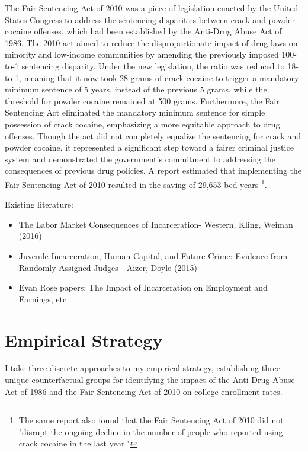 \documentclass{article}
\begin{document}
The Fair Sentencing Act of 2010 was a piece of legislation enacted by the United States Congress to address the sentencing disparities between crack and powder cocaine offenses, which had been established by the Anti-Drug Abuse Act of 1986. The 2010 act aimed to reduce the disproportionate impact of drug laws on minority and low-income communities by amending the previously imposed 100-to-1 sentencing disparity. Under the new legislation, the ratio was reduced to 18-to-1, meaning that it now took 28 grams of crack cocaine to trigger a mandatory minimum sentence of 5 years, instead of the previous 5 grams, while the threshold for powder cocaine remained at 500 grams. Furthermore, the Fair Sentencing Act eliminated the mandatory minimum sentence for simple possession of crack cocaine, emphasizing a more equitable approach to drug offenses. Though the act did not completely equalize the sentencing for crack and powder cocaine, it represented a significant step toward a fairer criminal justice system and demonstrated the government's commitment to addressing the consequences of previous drug policies. A \cite{ussc} report estimated that implementing the Fair Sentencing Act of 2010 resulted in the saving of 29,653 bed years \footnote{The same report also found that the Fair Sentencing Act of 2010 did not "disrupt the ongoing decline in the number of people who reported using crack cocaine in the last year."}. 


Existing literature:
\begin{itemize}[itemsep=0.05mm, parsep=0pt]
  \item The Labor Market Consequences of Incarceration- Western, Kling, Weiman (2016)
  \item Juvenile Incarceration, Human Capital, and Future Crime: Evidence from Randomly Assigned Judges - Aizer, Doyle (2015)
  \item Evan Rose papers: The Impact of Incarceration on Employment and Earnings, etc
\end{itemize}



\section{Empirical Strategy}

I take three discrete approaches to my empirical strategy, establishing three unique counterfactual groups for identifying the impact of the Anti-Drug Abuse Act of 1986 and the Fair Sentencing Act of 2010 on college enrollment rates. 
\end{document}
